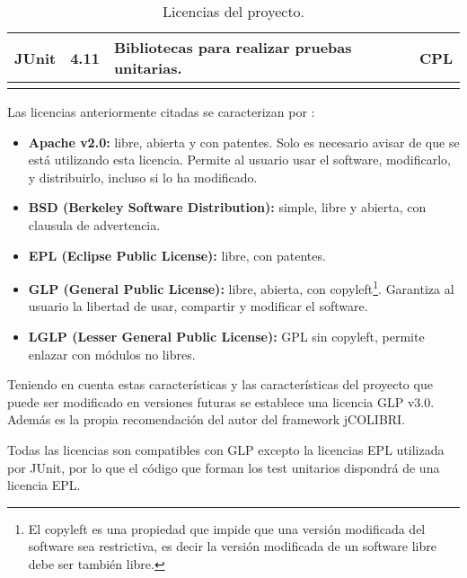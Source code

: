 \begin{longtable}[]{@{}llll@{}}
\begin{minipage}[t]{0.18\columnwidth}\raggedright\strut
JUnit \cite{lic:junit} \strut
\end{minipage} & \begin{minipage}[t]{0.08\columnwidth}\raggedright\strut
4.11\strut
\end{minipage} & \begin{minipage}[t]{0.49\columnwidth}\raggedright\strut
Bibliotecas para realizar pruebas unitarias.\strut
\end{minipage} & \begin{minipage}[t]{0.11\columnwidth}\raggedright\strut
CPL\strut
\end{minipage}\tabularnewline


\bottomrule
\caption{Licencias del proyecto.}
\end{longtable}

Las licencias anteriormente citadas se caracterizan por \cite{lic:tipos}:

\begin{itemize}
\tightlist
\item
\textbf{Apache v2.0:} libre, abierta y con patentes. Solo es necesario avisar de que se está utilizando esta licencia. Permite al usuario usar el software, modificarlo, y distribuirlo, incluso si lo ha modificado.
\item
\textbf{BSD (Berkeley Software Distribution):} simple, libre y abierta, con clausula de advertencia.
\item
\textbf{EPL (Eclipse Public License):} libre, con patentes.
\item
\textbf{GLP (General Public License):} libre, abierta, con copyleft\footnote{El copyleft es una propiedad que impide que una versión modificada del software sea restrictiva, es decir la versión modificada de un software libre debe ser también libre.}. Garantiza al usuario la libertad de usar, compartir y modificar el software.
\item
\textbf{LGLP (Lesser General Public License):} GPL sin copyleft, permite enlazar con módulos no libres.
\end{itemize}

Teniendo en cuenta estas características y las características del proyecto que puede ser modificado en versiones futuras se establece una licencia GLP v3.0. Además es la propia recomendación del autor del framework jCOLIBRI.

Todas las licencias son compatibles con GLP \cite{lic:compgnu} excepto la licencias EPL utilizada por JUnit, por lo que el código que forman los test unitarios dispondrá de una licencia EPL.

